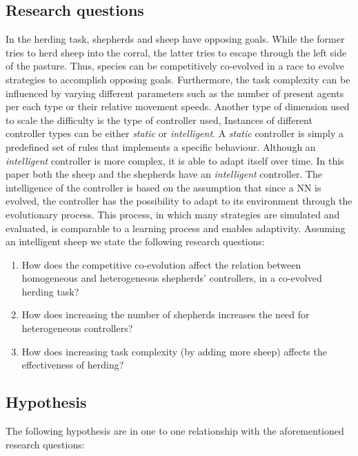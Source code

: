 \documentclass[conference]{IEEEtran}
\begin{document}
\subsection{Research questions}
\label{sec:researchQuestions}
In the herding task, shepherds and sheep have opposing goals.
While the former tries to herd sheep into the corral, the latter tries to escape through the left side of the pasture. 
Thus, species can be competitively co-evolved in a race to evolve strategies to accomplish opposing goals. 
Furthermore, the task complexity can be influenced by varying different parameters such as the number of present agents per each type or their relative movement speeds. 
Another type of dimension used to scale the difficulty is the type of controller used,
Instances of different controller types can be either \textit{static} or \textit{intelligent}.
A \textit{static} controller is simply a predefined set of rules that implements a specific behaviour.
Although an \textit{intelligent} controller is more complex, it is able to  adapt itself over time.
In this paper both the sheep and the shepherds have an \textit{intelligent} controller.
The intelligence of the controller is based on the assumption that since a NN is evolved, the controller has the possibility to adapt to its environment through the evolutionary process. 
This process, in which many strategies are simulated and evaluated, is comparable to a learning process and enables adaptivity. 
Assuming an intelligent sheep we state the following research questions:

\begin{enumerate}
	\item How does the competitive co-evolution affect the relation between homogeneous and heterogeneous shepherds' controllers, in a co-evolved herding task?
	\item How does increasing the number of shepherds increases the need for heterogeneous controllers?
	\item How does increasing task complexity (by adding more sheep) affects the effectiveness of herding?
\end{enumerate}

\subsection{Hypothesis}
\label{sec:hypothesis}
The following hypothesis are in one to one relationship with the aforementioned research questions:
\end{document}

